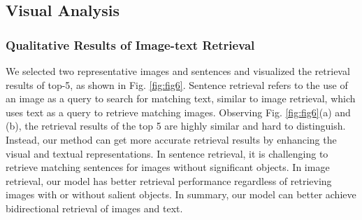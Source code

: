 \documentclass[journal]{IEEEtran}
\begin{document}
\subsection{Visual Analysis}
\subsubsection{Qualitative Results of Image-text Retrieval}
We selected two representative images and sentences and visualized the retrieval results of top-5, as shown in Fig. \ref{fig:fig6}. Sentence retrieval refers to the use of an image as a query to search for matching text, similar to image retrieval, which uses text as a query to retrieve matching images. Observing Fig. \ref{fig:fig6}(a) and (b), the retrieval results of the top 5 are highly similar and hard to distinguish. Instead, our method can get more accurate retrieval results by enhancing the visual and textual representations. In sentence retrieval, it is challenging to retrieve matching sentences for images without significant objects. In image retrieval, our model has better retrieval performance regardless of retrieving images with or without salient objects. In summary, our model can better achieve bidirectional retrieval of images and text.
\end{document}
